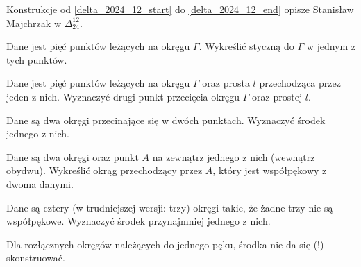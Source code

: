 %

Konstrukcje od \ref{delta_2024_12_start} do \ref{delta_2024_12_end} opisze Stanisław Majchrzak w $\Delta_{24}^{12}$.

\begin{geoconstruction}
    \label{delta_2024_12_start}
    Dane jest pięć punktów leżących na okręgu $\Gamma$.
    Wykreślić styczną do $\Gamma$ w jednym z tych punktów.
\end{geoconstruction}

\begin{geoconstruction}
    Dane jest pięć punktów leżących na okręgu $\Gamma$ oraz prosta $l$ przechodząca przez jeden z nich.
    Wyznaczyć drugi punkt przecięcia okręgu $\Gamma$ oraz prostej $l$.
\end{geoconstruction}

\begin{geoconstruction}
    Dane są dwa okręgi przecinające się w dwóch punktach.
    Wyznaczyć środek jednego z nich.
\end{geoconstruction}

\begin{geoconstruction}
    Dane są dwa okręgi oraz punkt $A$ na zewnątrz jednego z nich (wewnątrz obydwu).
    Wykreślić okrąg przechodzący przez $A$, który jest współpękowy z dwoma danymi.
\end{geoconstruction}

\begin{geoconstruction}
    \label{delta_2024_12_end}
    Dane są cztery (w trudniejszej wersji: trzy) okręgi takie, że żadne trzy nie są współpękowe.
    Wyznaczyć środek przynajmniej jednego z nich.
\end{geoconstruction}

Dla rozłącznych okręgów należących do jednego pęku, środka nie da się (!) skonstruować.

%